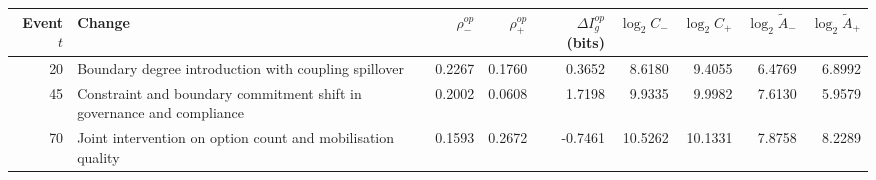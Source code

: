 \begin{tabular}{rlrrrrrrr}
\toprule
Event $t$ & Change & $\rho^{op}_{-}$ & $\rho^{op}_{+}$ & $\Delta I_g^{op}$ (bits) & $\log_2 C_{-}$ & $\log_2 C_{+}$ & $\log_2 \tilde{A}_{-}$ & $\log_2 \tilde{A}_{+}$ \\
\midrule
20 & Boundary degree introduction with coupling spillover & 0.2267 & 0.1760 & 0.3652 & 8.6180 & 9.4055 & 6.4769 & 6.8992 \\
45 & Constraint and boundary commitment shift in governance and compliance & 0.2002 & 0.0608 & 1.7198 & 9.9335 & 9.9982 & 7.6130 & 5.9579 \\
70 & Joint intervention on option count and mobilisation quality & 0.1593 & 0.2672 & -0.7461 & 10.5262 & 10.1331 & 7.8758 & 8.2289 \\
\bottomrule
\end{tabular}
